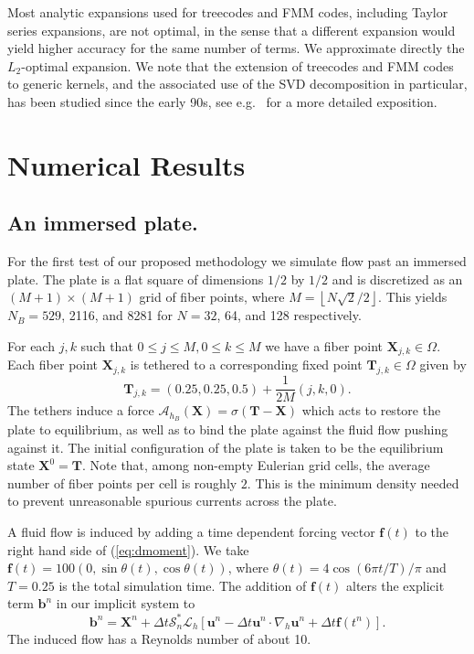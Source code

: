 \documentclass[preprint,12pt]{elsarticle}
\newcommand{\floor}[1]{\left\lfloor #1 \right\rfloor}
\newcommand{\B}[1]{\mathbf{#1}}
\newcommand{\C}[1]{\mathcal{#1}}
\begin{document}
Most analytic expansions used for treecodes and FMM codes, including Taylor series expansions, are not optimal, in the sense that a different expansion would yield higher accuracy for the same number of terms. We approximate directly the $L_2$-optimal expansion. We note that the extension of treecodes and FMM codes to generic kernels, and the associated use of the SVD decomposition in particular, has been studied since the early 90s, see e.g.~\cite{SVDFMM_GimbutasEtAl} for a more detailed exposition.





\section{Numerical Results}
\label{sec:TestProblems}

\subsection{An immersed plate.}
For the first test of our proposed methodology we simulate flow past an immersed plate. The plate is a flat square of dimensions $1/2$ by $1/2$ and is discretized as an $(M+1)\times (M+1)$ grid of fiber points, where $M = \floor{N\sqrt{2}/2}$. This yields $N_B=529$, 2116, and 8281 for $N=32$, 64, and 128 respectively.

For each $j,k$ such that $0 \leq j \leq M, 0 \leq k \leq M$ we have a fiber point $\B{X}_{j,k}\in\Omega$. Each fiber point $\B{X}_{j,k}$ is tethered to a corresponding fixed point $\B{T}_{j,k}\in\Omega$ given by
\begin{equation}
\B{T}_{j,k}= (0.25,0.25,0.5) + \frac{1}{2M} (j, k, 0).
\end{equation}
The tethers induce a force $\C{A}_{h_B}(\B{X}) = \sigma(\B{T} - \B{X})$ which acts to restore the plate to equilibrium, as well as to bind the plate against the fluid flow pushing against it. The initial configuration of the plate is taken to be the equilibrium state $\B{X}^0 = \B{T}$. Note that, among non-empty Eulerian grid cells, the average number of fiber points per cell is roughly $2$. This is the minimum density needed to prevent unreasonable spurious currents across the plate.

A fluid flow is induced by adding a time dependent forcing vector $\B{f}(t)$ to the right hand side of (\ref{eq:dmoment}). We take $\B{f}(t) = 100 (0, \sin \theta(t), \cos \theta(t))$, where $\theta(t) = 4\cos(6\pi t / T) / \pi$ and $T=0.25$ is the total simulation time. The addition of $\B{f}(t)$ alters the explicit term $\B{b}^n$ in our implicit system to
\begin{equation}
\B{b}^n = \B{X}^n + \Delta t \C{S}^*_n \C{L}_h [\B{u}^n-\Delta t \B{u}^n \cdot \nabla_h \B{u}^n + \Delta t \B{f}(t^n)].
\label{eq:bn_flow}
\end{equation}
The induced flow has a Reynolds number of about 10.
\end{document}
